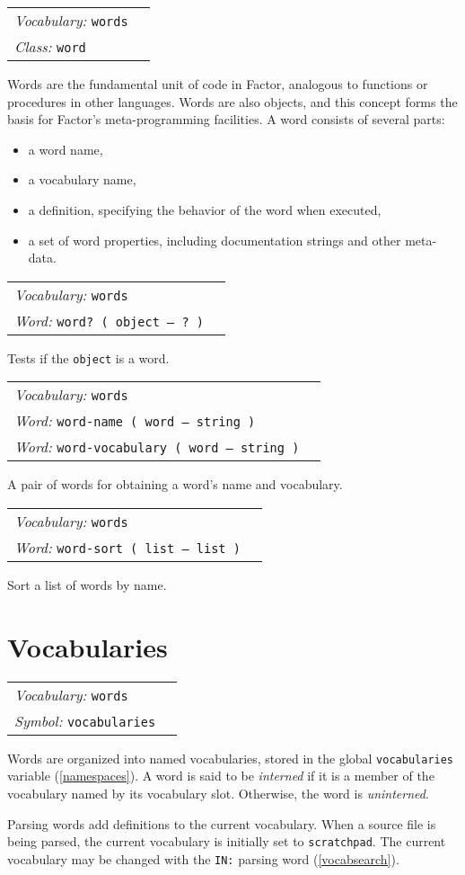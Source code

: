 \documentclass{book}
\newcommand{\vocabulary}[1]{\emph{Vocabulary:} \texttt{#1}&\\}
\newcommand{\ordinaryword}[2]{\index{\texttt{#1}}\emph{Word:} \texttt{#2}&\\}
\newcommand{\symbolword}[1]{\index{\texttt{#1}}\emph{Symbol:} \texttt{#1}&\\}
\newcommand{\classword}[1]{\index{\texttt{#1}}\emph{Class:} \texttt{#1}&\\}
\newcommand{\wordtable}[1]{


\begin{tabularx}{12cm}{lX}
\hline
#1
\hline
\end{tabularx}

}
\begin{document}
\wordglos
\vocabglos
\newcommand{\definingwordglos}{\glossary{name=defining word,
description=a word that adds definitions to the dictionary}}
\wordtable{
\vocabulary{words}
\classword{word}
}
Words are the fundamental unit of code in Factor, analogous to functions or procedures in other languages. Words are also objects, and this concept forms the basis for Factor's meta-programming facilities. A word consists of several parts:
\begin{itemize}
\item a word name,
\item a vocabulary name,
\item a definition, specifying the behavior of the word when executed,
\item a set of word properties, including documentation strings and other meta-data.
\end{itemize}
\wordtable{
\vocabulary{words}
\ordinaryword{word?}{word?~( object -- ?~)}
}
Tests if the \texttt{object} is a word.

\wordtable{
\vocabulary{words}
\ordinaryword{word-name}{word-name ( word -- string )}
\ordinaryword{word-vocabulary}{word-vocabulary ( word -- string )}
}
A pair of words for obtaining a word's name and vocabulary.

\wordtable{
\vocabulary{words}
\ordinaryword{word-sort}{word-sort ( list -- list )}

}
Sort a list of words by name.

\section{Vocabularies}
\wordtable{
\vocabulary{words}
\symbolword{vocabularies}
}

Words are organized into named vocabularies, stored in the global \texttt{vocabularies} variable (\ref{namespaces}). A word is said to be \emph{interned} if it is a member of the vocabulary named by its vocabulary slot. Otherwise, the word is \emph{uninterned}.

Parsing words add definitions to the current vocabulary. When a source file is being parsed, the current vocabulary is initially set to \texttt{scratchpad}. The current vocabulary may be changed with the \verb|IN:| parsing word (\ref{vocabsearch}).
\end{document}

